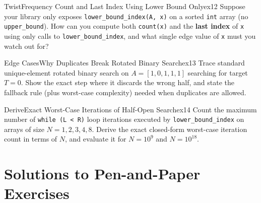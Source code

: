 \documentclass[11pt,a4paper]{article}
\theoremstyle{definition}
\begin{document}
\begin{tryitbox}{Twist}{Frequency Count and Last Index Using Lower Bound Only}{ex12}
Suppose your library only exposes \texttt{lower\_bound\_index(A, x)} on a sorted \texttt{int} array (no \texttt{upper\_bound}). How can you compute both \texttt{count(x)} and the \textbf{last index} of \texttt{x} using only calls to \texttt{lower\_bound\_index}, and what single edge value of \texttt{x} must you watch out for?
\end{tryitbox}

\begin{tryitbox}{Edge Cases}{Why Duplicates Break Rotated Binary Search}{ex13}
Trace standard unique-element rotated binary search on $A = [1, 0, 1, 1, 1]$ searching for target $T = 0$. Show the exact step where it discards the wrong half, and state the fallback rule (plus worst-case complexity) needed when duplicates are allowed.
\end{tryitbox}

\begin{tryitbox}{Derive}{Exact Worst-Case Iterations of Half-Open Search}{ex14}
Count the maximum number of \texttt{while (L < R)} loop iterations executed by \texttt{lower\_bound\_index} on arrays of size $N = 1, 2, 3, 4, 8$. Derive the exact closed-form worst-case iteration count in terms of $N$, and evaluate it for $N = 10^9$ and $N = 10^{18}$.
\end{tryitbox}

\section*{Solutions to Pen-and-Paper Exercises}
\end{document}
